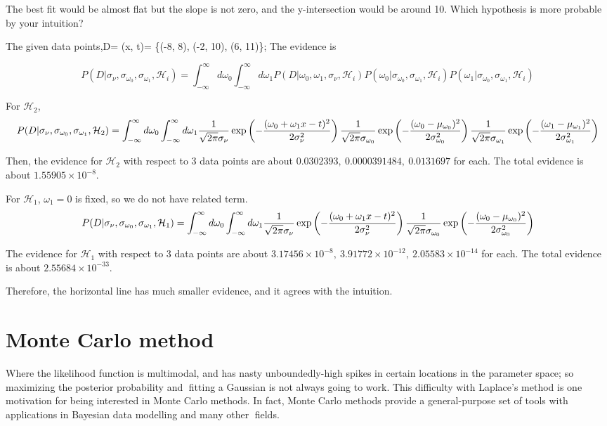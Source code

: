 \documentclass[a4paper,11pt]{article}
\numberwithin{equation}{section}
\begin{document}
{The best fit would be almost flat but the slope is not zero, and the y-intersection would be around 10. Which hypothesis is more probable by your intuition? 


The given data points,D= (x, t)= \{(-8, 8), (-2, 10), (6, 11)\};
The evidence is  

{\small 
$$
P(D|\sigma_{\nu}, \sigma_{\omega_0},\sigma_{\omega_1},\mathcal{H}_i) = \int^{\infty}_{-\infty} d\omega_0 \int^{\infty}_{-\infty} d\omega_1 P(D|\omega_0, \omega_1,\sigma_{\nu}, \mathcal{H}_i) P(\omega_0| \sigma_{\omega_0},\sigma_{\omega_1},\mathcal{H}_i)P(\omega_1| \sigma_{\omega_0},\sigma_{\omega_1},\mathcal{H}_i)
$$ }

For $\mathcal{H}_2$,
{\tiny
$$
P(D|\sigma_{\nu}, \sigma_{\omega_0},\sigma_{\omega_1},\mathcal{H}_2) = \int^{\infty}_{-\infty} d\omega_0 \int^{\infty}_{-\infty} d\omega_1 
{1\over \sqrt{2\pi }\sigma_{\nu}} 
\exp\left(-{(\omega_0+\omega_1 x - t)^2\over 2\sigma^2_{\nu}}\right){1\over \sqrt{2\pi }\sigma_{\omega_0}} 
\exp\left(-{(\omega_0-\mu_{\omega_0})^2\over 2\sigma^2_{{\omega_0}}}\right){1\over \sqrt{2\pi }\sigma_{\omega_1}} 
\exp\left(-{(\omega_1-\mu_{\omega_1})^2\over 2\sigma^2_{{\omega_1}}}\right)
$$ }

Then, the evidence for $\mathcal{H}_2$ with respect to 3 data points are about $0.0302393, ~0.0000391484, ~0.0131697$ for each. The total evidence is about $1.55905 \times 10^{-8}$.



For $\mathcal{H}_1$, $\omega_1 =0$ is fixed, so we do not have related term. 
{\small $$
P(D|\sigma_{\nu}, \sigma_{\omega_0},\sigma_{\omega_1},\mathcal{H}_1) = \int^{\infty}_{-\infty} d\omega_0 \int^{\infty}_{-\infty} d\omega_1 
{1\over \sqrt{2\pi }\sigma_{\nu}} 
\exp\left(-{(\omega_0+\omega_1 x - t)^2\over 2\sigma^2_{\nu}}\right){1\over \sqrt{2\pi }\sigma_{\omega_0}} 
\exp\left(-{(\omega_0-\mu_{\omega_0})^2\over 2\sigma^2_{{\omega_0}}}\right)
$$ }

The evidence for $\mathcal{H}_1$ with respect to 3 data points are about $3.17456 \times 10^{-8},~3.91772 \times 10^{-12},~2.05583 \times 10^{-14}$ for each. The total evidence is about $2.55684 \times 10^{-33}$.

Therefore, the horizontal line has much smaller evidence, and it agrees with the intuition. 


\section{Monte Carlo method}
Where the likelihood function
is multimodal, and has nasty unboundedly-high spikes in certain locations in
the parameter space; so maximizing the posterior probability and fitting a
Gaussian is not always going to work. This difficulty with Laplace's method is
one motivation for being interested in Monte Carlo methods. In fact, Monte
Carlo methods provide a general-purpose set of tools with applications in
Bayesian data modelling and many other fields.

}
\end{document}
